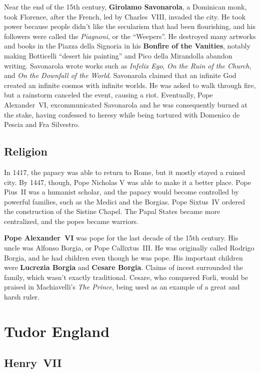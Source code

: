 Near the end of the 15th century, \textbf{Girolamo Savonarola}, a Dominican monk, took Florence,
after the French, led by Charles~VIII, invaded the city.
He took power because people didn't like the secularism that had been flourishing,
and his followers were called the \textit{Piagnoni}, or the ``Weepers''.
He destroyed many artworks and books in the Piazza della Signoria in his \textbf{Bonfire of the Vanities},
notably making Botticelli ``desert his painting'' and Pico della Mirandolla abandon writing.
Savonarola wrote works such as
\textit{Infelix Ego},
\textit{On the Ruin of the Church},
and \textit{On the Downfall of the World}.
Savonarola claimed that an infinite God created an infinite cosmos with infinite worlds.
He was asked to walk through fire, but a rainstorm canceled the event, causing a riot.
Eventually, Pope Alexander~VI, excommunicated Savonarola and he was consequently burned at the stake,
having confessed to heresy while being tortured with Domenico de Pescia and Fra Silvestro.

\subsection*{Religion}

In 1417, the papacy was able to return to Rome, but it mostly stayed a ruined city.
By 1447, though, Pope Nicholas V was able to make it a better place.
Pope Pius~II was a humanist scholar, and the papacy would become controlled by powerful families,
such as the Medici and the Borgias.
Pope Sixtus~IV ordered the construction of the Sistine Chapel.
The Papal States became more centralized, and the popes became warriors.

\textbf{Pope Alexander~VI} was pope for the last decade of the 15th century.
His uncle was Alfonso Borgia, or Pope Callixtus~III\@.
He was originally called Rodrigo Borgia, and he had children even though he was pope.
His important children were \textbf{Lucrezia Borgia} and \textbf{Cesare Borgia}.
Claims of incest surrounded the family, which wasn't exactly traditional.
Cesare, who conquered Forli, would be praised in Machiavelli's \textit{The Prince},
being used as an example of a great and harsh ruler.

\section{Tudor England}

\subsection*{Henry~VII}

